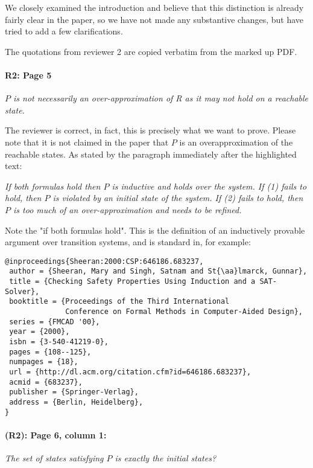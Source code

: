 \documentclass{article}
\begin{document}
We closely examined the introduction and believe that this distinction is already fairly clear in the paper, so we have not made any substantive changes, but have tried to add a few clarifications.

The quotations from reviewer 2 are copied verbatim from the marked up PDF.


\paragraph{R2: Page 5} \textit{$P$ is not necessarily an
over-approximation of R as it may not hold on a reachable state.}
\vspace{0.05in}


\noindent The reviewer is correct, in fact, this is precisely what we want to prove.
Please note that it is not claimed in the paper that $P$ is an overapproximation of the reachable states. As stated by the paragraph immediately after the highlighted text:

\textit{If both formulas hold then $P$ is inductive and holds over the
system. If (1) fails to hold, then $P$ is violated by an initial
state of the system. If (2) fails to hold, then $P$ is too much of an
over-approximation and needs to be refined.}

Note the "if both formulas hold". This is the definition of an
inductively provable argument over transition systems, and is
standard in, for example:

\begin{small}
\begin{verbatim}
@inproceedings{Sheeran:2000:CSP:646186.683237,
 author = {Sheeran, Mary and Singh, Satnam and St{\aa}lmarck, Gunnar},
 title = {Checking Safety Properties Using Induction and a SAT-Solver},
 booktitle = {Proceedings of the Third International
              Conference on Formal Methods in Computer-Aided Design},
 series = {FMCAD '00},
 year = {2000},
 isbn = {3-540-41219-0},
 pages = {108--125},
 numpages = {18},
 url = {http://dl.acm.org/citation.cfm?id=646186.683237},
 acmid = {683237},
 publisher = {Springer-Verlag},
 address = {Berlin, Heidelberg},
}
\end{verbatim}
\end{small}

\paragraph{(R2): Page 6, column 1:} \textit{The set of states satisfying $P$ is exactly the initial states?}
\end{document}
